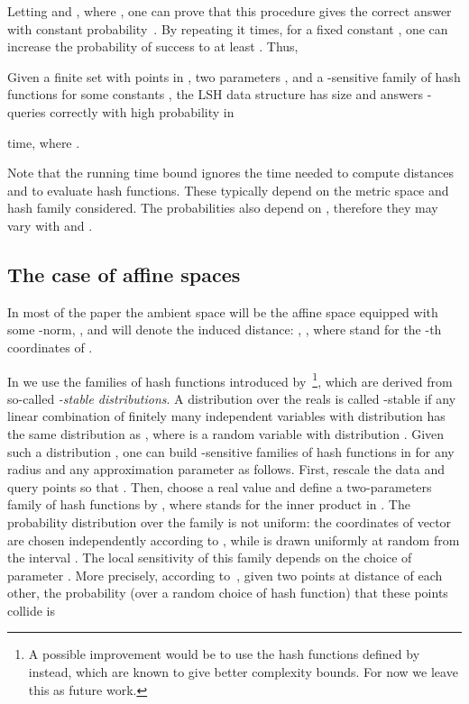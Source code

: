 Letting  and
, where ,
one can prove that this procedure gives the correct answer with
constant probability~\cite{GIM99,IM98}. By repeating it 
times, for a fixed constant , one can increase the probability of
success to at least .  Thus,
\begin{thm}\label{th:lsh4renn}
  Given a finite set  with  points in , two parameters
  , and a -sensitive family  of hash
  functions for some constants , the LSH data structure has
  size  and answers -\pleb
  queries correctly with high probability in
  
  time, where .
\end{thm}
Note that the running time bound ignores the time needed to compute
distances and to evaluate hash functions. These typically depend on
the metric space  and hash family  considered.
The probabilities  also depend on
, therefore they may vary with  and .

\subsection{The case of affine spaces}
\label{sec:pleb_affine}

In most of the paper the ambient space  will be the affine
space  equipped with some -norm, , and  will denote the induced distance: , , where  stand for the -th
coordinates of .

In  we use the families of hash functions introduced
by~\citet{DIIM04}\footnote{A possible improvement would be to use the
  hash functions defined by~\citet{AI06} instead, which are known to
  give better complexity bounds. For now we leave this as future
  work.}, which are derived from so-called {\em -stable
  distributions}. A distribution  over the reals is called
-stable if any linear combination  of
finitely many independent variables  with distribution  has
the same distribution as , where  is
a random variable with distribution .  Given such a distribution
, one can build -sensitive families of hash
functions in  for any radius  and any
approximation parameter  as follows. First, rescale the data and
query points so that . Then, choose a real value  and define
a two-parameters family of hash functions
 by
  , where 
  stands for the inner product in . The probability distribution
  over the family is not uniform: the coordinates of vector
   are chosen independently according to , while  is drawn
  uniformly at random from the interval .  The local
    sensitivity of this family depends on the choice of parameter
    . More precisely, according to~\citet{DIIM04}, given two points
    at distance  of each other, the probability (over a random
    choice of hash function) that these points collide is

